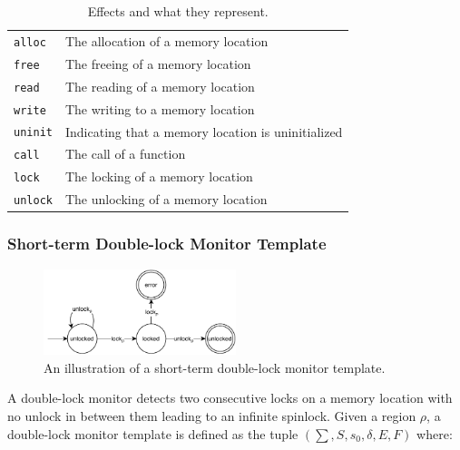\begin{table}[H]
    \centering
    \begin{tabular}{ll}
        \texttt{alloc}  & The allocation of a memory location                   \\
        \texttt{free}   & The freeing of a memory location                      \\
        \texttt{read}   & The reading of a memory location                      \\
        \texttt{write}  & The writing to a memory location                      \\
        \texttt{uninit} & Indicating that a memory location is uninitialized    \\
        \texttt{call}   & The call of a function                                \\
        \texttt{lock}   & The locking of a memory location                      \\
        \texttt{unlock} & The unlocking of a memory location    
    \end{tabular}
    \caption{Effects and what they represent.}
    \label{effect-table}
\end{table}

\subsubsection*{Short-term Double-lock Monitor Template}

\begin{figure}[H]
    \centering
    \includegraphics[width=0.5\textwidth]{algorithm/figures/double-lock-short-term}
    \caption{An illustration of a short-term double-lock monitor template.}
    \label{double-lock-automata-short-term}
\end{figure}

A double-lock monitor detects two consecutive locks on a memory location with no unlock in between them leading to an infinite spinlock. Given a region $\rho$, a double-lock monitor template is defined as the tuple $(\sum, S, s_0, \delta, E, F)$ where: 

